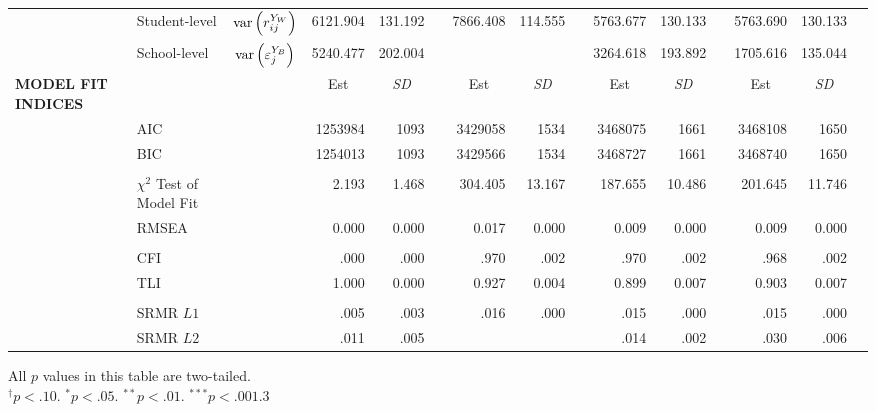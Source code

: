 {\begin{tabular}{l @{\hskip -7.9cm} l c rr @{\hskip -0.1mm}l rr @{\hskip -0.1mm}l rr @{\hskip -0.1mm}l rr @{\hskip -0.1mm}l}
    & Student-level & $\text{var}\left(r^{Y_W}_{ij}\right)$ & 6121.904 & 131.192 &       & 7866.408 & 114.555 &       & 5763.677 & 130.133 &       & 5763.690 & 130.133 &  \\
    & School-level & $\text{var}\left(\varepsilon^{Y_B}_j\right)$ & 5240.477 & 202.004 &       &       &       &       & 3264.618 & 193.892 &       & 1705.616 & 135.044 &  \\
\midrule
    \textbf{MODEL FIT INDICES} &       &       & \multicolumn{1}{c}{Est} & \multicolumn{1}{c}{\textit{SD}} &       & \multicolumn{1}{c}{Est} & \multicolumn{1}{c}{\textit{SD}} &       & \multicolumn{1}{c}{Est} & \multicolumn{1}{c}{\textit{SD}} &       & \multicolumn{1}{c}{Est} & \multicolumn{1}{c}{\textit{SD}} &  \\
    \cmidrule{4-5}\cmidrule{7-8}\cmidrule{10-11}\cmidrule{13-14}          & AIC   &       & 1253984 & 1093  &       & 3429058 & 1534  &       & 3468075 & 1661  &       & 3468108 & 1650  &  \\
    & BIC   &       & 1254013 & 1093  &       & 3429566 & 1534  &       & 3468727 & 1661  &       & 3468740 & 1650  &  \\
    &&&&&&&&&&&&&&\\
    & $\chi^2$ Test of Model Fit &       & 2.193 & 1.468 &       & 304.405 & 13.167 &       & 187.655 & 10.486 &       & 201.645 & 11.746 &  \\
    & RMSEA &       & 0.000 & 0.000 &       & 0.017 & 0.000 &       & 0.009 & 0.000 &       & 0.009 & 0.000 &  \\
    &&&&&&&&&&&&&&\\
    & CFI   &       & .000 & .000 &       & .970 & .002 &       & .970 & .002 &       & .968 & .002 &  \\
    & TLI   &       & 1.000 & 0.000 &       & 0.927 & 0.004 &       & 0.899 & 0.007 &       & 0.903 & 0.007 &  \\
    &&&&&&&&&&&&&&\\
    & SRMR $L1$ &       & .005 & .003 &       & .016 & .000 &       & .015 & .000 &       & .015 & .000 &  \\
    & SRMR $L2$ &       & .011 & .005 &       &       &       &       & .014 & .002 &       & .030 & .006 &  \\
\bottomrule
    \end{tabular}
}{All $p$ values in this table are two-tailed.\\
$^\dagger p < .10$. $^* p < .05$. $^{**} p < .01$. $^{***} p < .001$.}{3}
